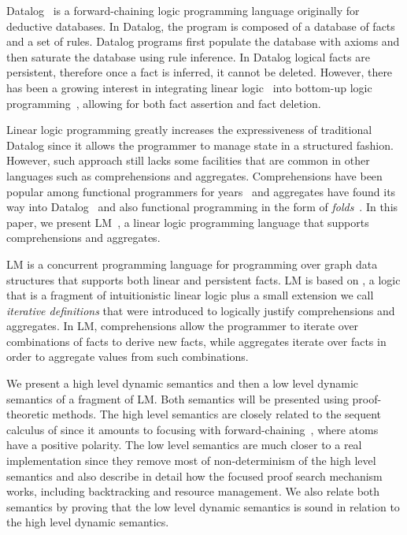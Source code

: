 
Datalog~\cite{Ramakrishnan93asurvey} is a forward-chaining logic programming
language originally for deductive databases. In Datalog, the program is composed
of a database of facts and a set of rules. Datalog programs first populate the
database with axioms and then saturate the database using rule inference. In
Datalog logical facts are persistent, therefore once a fact is inferred, it
cannot be deleted. However, there has been a growing interest in integrating
linear logic~\cite{girard-87} into bottom-up logic
programming~\cite{Chang03ajudgmental,cruz-iclp14,Lopez:2005:MCL:1069774.1069778,simmons-lla},
allowing for both fact assertion and fact deletion.

Linear logic programming greatly increases the expressiveness of traditional
Datalog since it allows the programmer to manage state in a structured fashion.
However, such approach still lacks some facilities that are common in other
languages such as comprehensions and aggregates. Comprehensions have been
popular among functional programmers for years~\cite{npl1977} and aggregates
have found its way into
Datalog~\cite{Consens93lowcomplexity,Greco:1999:DPD:627321.627989} and also
functional programming in the form of
\emph{folds}~\cite{Hutton:1999:TUE:968578.968579}.  In this paper, we present
LM~\cite{cruz-iclp14}, a linear logic programming language that supports
comprehensions and aggregates.

LM is a concurrent programming language for programming over graph data
structures that supports both linear and persistent facts. LM is based on
\fragment, a logic that is a fragment of intuitionistic linear logic plus a
small extension we call \emph{iterative definitions} that were introduced to
logically justify comprehensions and aggregates. In LM, comprehensions allow the
programmer to iterate over combinations of facts to derive new facts, while
aggregates iterate over facts in order to aggregate values from such
combinations.

We present a high level dynamic semantics and then a low level dynamic
semantics of a fragment of LM.  Both semantics will be presented using
proof-theoretic methods. The high level semantics are closely related to the
sequent calculus of \fragment since it amounts to focusing with
forward-chaining~\cite{Andreoli92logicprogramming,laurent2004proof}, where atoms
have a positive polarity.  The low level semantics are much closer to a real
implementation since they remove most of non-determinism of the high level
semantics and also describe in detail how the focused proof search mechanism
works, including backtracking and resource management. We also relate both
semantics by proving that the low level dynamic semantics is sound in relation
to the high level dynamic semantics.

